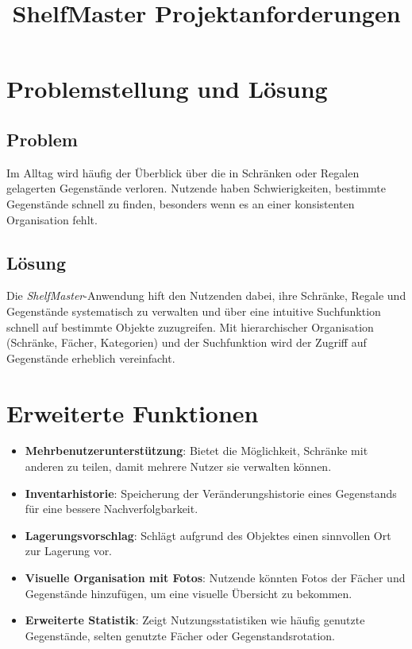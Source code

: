 \documentclass{article}
\title{ShelfMaster Projektanforderungen}
\begin{document}
\maketitle

\section{Problemstellung und Lösung}
  \subsection{Problem}
  Im Alltag wird häufig der Überblick über die in Schränken oder Regalen gelagerten Gegenstände
  verloren. Nutzende haben Schwierigkeiten, bestimmte Gegenstände schnell zu finden, besonders wenn es an
  einer konsistenten Organisation fehlt.

  \subsection{Lösung}
  Die \textit{ShelfMaster}-Anwendung hift den Nutzenden dabei, ihre Schränke, Regale und Gegenstände
  systematisch zu verwalten und über eine intuitive Suchfunktion schnell auf bestimmte Objekte zuzugreifen.
  Mit hierarchischer Organisation (Schränke, Fächer, Kategorien) und der Suchfunktion wird der Zugriff
  auf Gegenstände erheblich vereinfacht.

\section{Erweiterte Funktionen}
  \begin{itemize}
    \item \textbf{Mehrbenutzerunterstützung}: Bietet die Möglichkeit, Schränke mit anderen zu teilen, damit mehrere Nutzer sie verwalten können.
    \item \textbf{Inventarhistorie}: Speicherung der Veränderungshistorie eines Gegenstands für eine bessere Nachverfolgbarkeit.
    \item \textbf{Lagerungsvorschlag}: Schlägt aufgrund des Objektes einen sinnvollen Ort zur Lagerung vor.
    \item \textbf{Visuelle Organisation mit Fotos}: Nutzende könnten Fotos der Fächer und Gegenstände hinzufügen, um eine visuelle Übersicht zu bekommen.
    \item \textbf{Erweiterte Statistik}: Zeigt Nutzungsstatistiken wie häufig genutzte Gegenstände, selten genutzte Fächer oder Gegenstandsrotation.
  \end{itemize}
\end{document}

